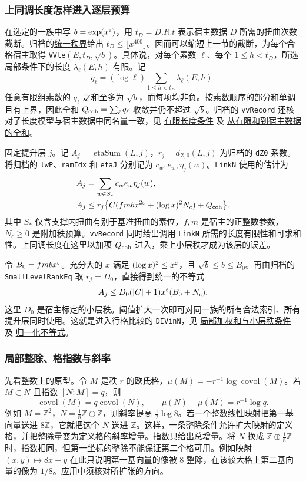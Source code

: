 \documentclass[UTF8,fontset=none,a4paper,11pt]{ctexart}
\theoremstyle{definition}
\newcommand{\src}[3]{\href{https://github.com/leanprover-community/riemann-hypothesis/blob/23aebbb302010b292314d406aa97f7901d698634/src/#1.lean\#L#2}{#3}}
\begin{document}
\subsubsection{上同调长度怎样进入逐层预算}
在选定的一族中写 $b=\exp(x^\varepsilon)$，用 $t_D=D.R.t$ 表示宿主数据 $D$ 所需的扭曲次数截断。归档的\src{Development/AutomorphicArithmetic/CharacterBoxes/EventuallyRankLeRpowOfLtOneDivFiftytwo}{7}{统一秩界}给出 $t_D\le\lfloor x^{400}\rfloor$。因而可以缩短上一节的截断，为每个合格宿主取得 \texttt{VVle}$(E,t_D,\sqrt b)$。具体说，对每个素数 $\ell$、每个 $1\le h<t_D$，所选局部条件下的长度 $\lambda_\ell(E,h)$ 有限。记
\[
 q_\ell=(\log\ell)\sum_{1\le h<t_D}\lambda_\ell(E,h).
\]
任意有限组素数的 $q_\ell$ 之和至多为 $\sqrt b$，而每项均非负。按素数顺序的部分和单调且有上界，因此全和 $Q_{\rm coh}=\sum_\ell q_\ell$ 收敛并仍不超过 $\sqrt b$。归档的 \texttt{vvRecord} 还核对了长度模型与宿主数据中同名量一致，见
\src{Development/AutomorphicArithmetic/CharacterBoxes/ExistsPageN}{12}{有限长度条件}
及 \src{Development/AutomorphicArithmetic/CharacterBoxes/DivinNOfHypV}{17}{从有限和到宿主数据的全和}。

固定提升层 $j$。记 $A_j=\operatorname{etaSum}(L,j)$，$r_j=d_{Z,0}(L,j)$ 为归档的 \texttt{dZ0} 系数。将归档的 \texttt{lwP}、\texttt{ramIdx} 和 \texttt{etaJ} 分别记为 $c_w,e_w,\eta_j(w)$。\texttt{LinkN} 使用的估计为
\begin{align*}
 A_j&=\sum_{w\in S_*} c_w e_w\eta_j(w),\\
 A_j&\le r_j\bigl\{C(fmbx^{2\varepsilon}+(\log x)^2N_c)+Q_{\rm coh}\bigr\}.
\end{align*}
其中 $S_*$ 仅含支撑内扭曲有别于基准扭曲的素位，$f,m$ 是宿主的正整数参数，$N_c\ge0$ 是附加秩预算。\texttt{vvRecord} 同时给出调用 \texttt{LinkN} 所需的长度有限性和可求和性。上同调长度在这里以加项 $Q_{\rm coh}$ 进入，乘上小层秩才成为该层的误差。

令 $B_0=fmbx^\varepsilon$。充分大的 $x$ 满足 $(\log x)^2\le x^\varepsilon$，且 $\sqrt b\le b\le B_0$。再由归档的 \texttt{SmallLevelRankEq} 取 $r_j=D_0$，直接得到统一的不等式
\[
                   A_j\le D_0(|C|+1)x^\varepsilon(B_0+N_c).
\]
这里 $D_0$ 是宿主标定的小层秩。阈值扩大一次即可对同一族的所有合法索引、所有提升层同时使用。这就是进入行格比较的 \texttt{DIVinN}，见
\src{Formalism/SharpRestriction/GlobalTheoremInputs}{35}{局部加权和与小层秩条件}
及 \src{Development/AutomorphicArithmetic/CharacterBoxes/DivinNOfHypV}{76}{归一化不等式}。

\subsubsection{局部整除、格指数与斜率}
先看整数上的原型。令 $M$ 是秩 $r$ 的欧氏格，$\mu(M)=-r^{-1}\log\operatorname{covol}(M)$。若 $M\subset N$ 且指数 $[N:M]=q$，则
\[
 \operatorname{covol}(M)=q\operatorname{covol}(N),\qquad
 \mu(N)-\mu(M)=r^{-1}\log q.
\]
例如 $M=\mathbb Z^2$，$N=\tfrac18\mathbb Z\oplus\mathbb Z$，则斜率提高 $\tfrac12\log 8$。若一个整数线性映射把第一基向量送进 $8\mathbb Z$，它就把这个 $N$ 送进 $\mathbb Z$。这样，一条整除条件允许扩大映射的定义格，并把整除量变为定义格的斜率增量。指数只给出总增量。将 $N$ 换成 $\mathbb Z\oplus\tfrac18\mathbb Z$ 时，指数相同，但第一坐标的整除不能保证第二个格可用。例如映射 $(x,y)\mapsto 8x+y$ 在此只说明第一基向量的像被 $8$ 整除，在该较大格上第二基向量的像为 $1/8$。应用中须核对所扩张的方向。
\end{document}
